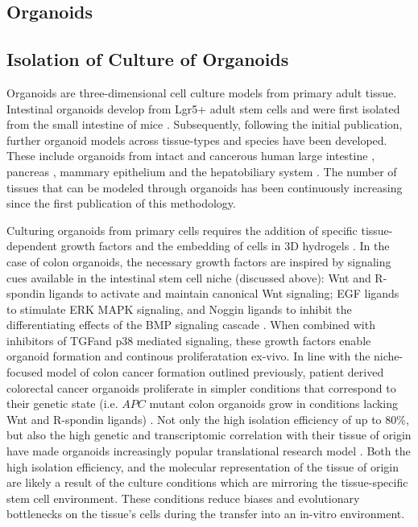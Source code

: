 \begin{flushleft}
\section{Organoids}

\subsection{Isolation of Culture of Organoids}

Organoids are three-dimensional cell culture models from primary adult tissue. Intestinal organoids develop from Lgr5+ adult stem cells and were first isolated from the small intestine of mice \citep{satoLongtermExpansionEpithelial2011}. Subsequently, following the initial publication, further organoid models across tissue-types and species have been developed. These include organoids from intact and cancerous human large intestine \citep{satoLongtermExpansionEpithelial2011}, pancreas \citep{driehuisPancreaticCancerOrganoids2019}, mammary epithelium \citep{zhangEstablishingEstrogenresponsiveMouse2017, sachsLivingBiobankBreast2018} and the hepatobiliary system \citep{huchVitroExpansionSingle2013}. The number of tissues that can be modeled through organoids has been continuously increasing since the first publication of this methodology. \par

Culturing organoids from primary cells requires the addition of specific tissue-dependent growth factors and the embedding of cells in 3D hydrogels \citep{merkerGastrointestinalOrganoidsHow2016}. In the case of colon organoids, the necessary growth factors are inspired by signaling cues available in the intestinal stem cell niche (discussed above): Wnt and R-spondin ligands to activate and maintain canonical Wnt signaling; EGF ligands to stimulate ERK MAPK signaling, and Noggin ligands to inhibit the differentiating effects of the BMP signaling cascade \citep{satoGrowingSelforganizingMiniguts2013}. When combined with inhibitors of TGF\textbeta and p38 mediated signaling, these growth factors enable organoid formation and continous proliferatation ex-vivo. In line with the niche-focused model of colon cancer formation outlined previously, patient derived colorectal cancer organoids proliferate in simpler conditions that correspond to their genetic state (i.e. $APC$ mutant colon organoids grow in conditions lacking Wnt and R-spondin ligands) \citep{Fujii2016-ax}. Not only the high isolation efficiency of up to 80\%, but also the high genetic and transcriptomic correlation with their tissue of origin have made organoids increasingly popular translational research model \citep{pauliPersonalizedVitroVivo2017a}. Both the high isolation efficiency, and the molecular representation of the tissue of origin are likely a result of the culture conditions which are mirroring the tissue-specific stem cell environment. These conditions reduce biases and evolutionary bottlenecks on the tissue's cells during the transfer into an in-vitro environment. \par


\end{flushleft}
